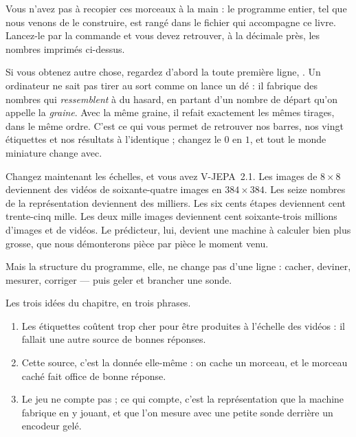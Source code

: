 Vous n'avez pas à recopier ces morceaux à la main : le programme entier, tel
que nous venons de le construire, est rangé dans le fichier
 qui accompagne ce livre. Lancez-le par
la commande  et vous devez retrouver,
à la décimale près, les nombres imprimés ci-dessus.

Si vous obtenez autre chose, regardez d'abord la toute première ligne,
. Un ordinateur ne sait pas tirer au sort
comme on lance un dé : il fabrique des nombres qui \emph{ressemblent} à du
hasard, en partant d'un nombre de départ qu'on appelle la \emph{graine}.
Avec la même graine, il refait exactement les mêmes tirages, dans le même
ordre. C'est ce qui vous permet de retrouver nos barres, nos vingt étiquettes
et nos résultats à l'identique ; changez le $0$ en $1$, et tout le monde
miniature change avec.

\begin{enia}
Changez maintenant les échelles, et vous avez V-JEPA~2.1. Les images de
$8 \times 8$ deviennent des vidéos de soixante-quatre images en
$384 \times 384$. Les seize nombres de la représentation deviennent des
milliers. Les six cents étapes deviennent cent trente-cinq mille. Les deux
mille images deviennent cent soixante-trois millions d'images et de vidéos.
Le prédicteur, lui, devient une machine à calculer bien plus grosse, que nous
démonterons pièce par pièce le moment venu.

Mais la structure du programme, elle, ne change pas d'une ligne : cacher,
deviner, mesurer, corriger — puis geler et brancher une sonde.
\end{enia}

\begin{aretenir}
Les trois idées du chapitre, en trois phrases.

\begin{enumerate}
  \item Les étiquettes coûtent trop cher pour être produites à l'échelle des
        vidéos : il fallait une autre source de bonnes réponses.
  \item Cette source, c'est la donnée elle-même : on cache un morceau, et le
        morceau caché fait office de bonne réponse.
  \item Le jeu ne compte pas ; ce qui compte, c'est la représentation que la
        machine fabrique en y jouant, et que l'on mesure avec une petite
        sonde derrière un encodeur gelé.
\end{enumerate}
\end{aretenir}

